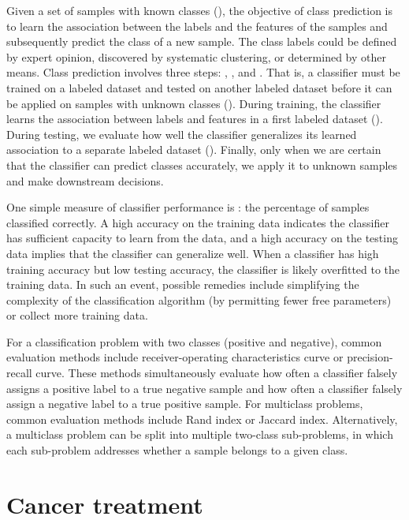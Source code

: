Given a set of samples with known classes (), the objective of class prediction is to learn the association between the labels and the features of the samples and subsequently predict the class of a new sample. The class labels could be defined by expert opinion, discovered by systematic clustering, or determined by other means. Class prediction involves three steps: , , and . That is, a classifier must be trained on a labeled dataset and tested on another labeled dataset before it can be applied on samples with unknown classes (). During training, the classifier learns the association between labels and features in a first labeled dataset (). During testing, we evaluate how well the classifier generalizes its learned association to a separate labeled dataset (). Finally, only when we are certain that the classifier can predict classes accurately, we apply it to unknown samples and make downstream decisions.

One simple measure of classifier performance is : the percentage of samples classified correctly. A high accuracy on the training data indicates the classifier has sufficient capacity to learn from the data, and a high accuracy on the testing data implies that the classifier can generalize well. When a classifier has high training accuracy but low testing accuracy, the classifier is likely overfitted to the training data. In such an event, possible remedies include simplifying the complexity of the classification algorithm (by permitting fewer free parameters) or collect more training data.

For a classification problem with two classes (positive and negative), common evaluation methods include receiver-operating characteristics curve or precision-recall curve. These methods simultaneously evaluate how often a classifier falsely assigns a positive label to a true negative sample and how often a classifier falsely assign a negative label to a true positive sample. For multiclass problems, common evaluation methods include Rand index or Jaccard index. Alternatively, a multiclass problem can be split into multiple two-class sub-problems, in which each sub-problem addresses whether a sample belongs to a given class.


\section{Cancer treatment}
\label{sec:cancer-treatment}

